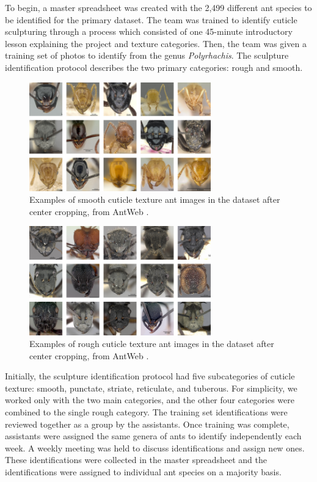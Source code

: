 \documentclass{aci}
\numberwithin{equation}{section}
\begin{document}
To begin, a master spreadsheet was created with the 2,499 different ant species
to be identified for the primary dataset. The team was trained to identify
cuticle sculpturing through a process which consisted of one 45-minute
introductory lesson explaining the project and texture categories. Then, the
team was given a training set of photos to identify from the genus
\textit{Polyrhachis}. The sculpture identification protocol describes the two
primary categories: rough and smooth.

\begin{figure}[h]
    \centering
    \includegraphics[width=0.7\textwidth]{assets/images/smooth_full_collage.png}
    \caption{Examples of smooth cuticle texture ant images in the dataset after
        center cropping, from AntWeb \cite{perrichot_antweb_2012}.}
    \label{fig:smooth-cuticle-texture}
\end{figure}

\begin{figure}[h]
    \centering
    \includegraphics[width=0.7\textwidth]{assets/images/rough_full_collage.png}
    \caption{Examples of rough cuticle texture ant images in the dataset after
        center cropping, from AntWeb \cite{perrichot_antweb_2012}.}
    \label{fig:rough-cuticle-texture}
\end{figure}

Initially, the sculpture identification protocol had five subcategories of
cuticle texture: smooth, punctate, striate, reticulate, and tuberous. For
simplicity, we worked only with the two main categories, and the other four
categories were combined to the single rough category. The training set
identifications were reviewed together as a group by the assistants. Once
training was complete, assistants were assigned the same genera of ants to
identify independently each week. A weekly meeting was held to discuss
identifications and assign new ones. These identifications were collected in the
master spreadsheet and the identifications were assigned to individual ant
species on a majority basis.
\end{document}
